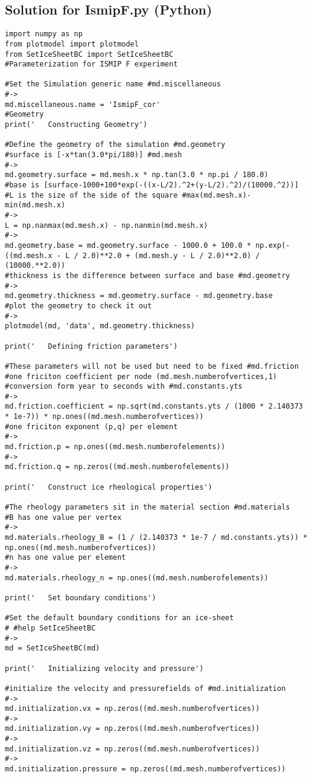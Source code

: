 \subsection{Solution for IsmipF.py (Python)}%
\begin{verbatim}import numpy as np
from plotmodel import plotmodel
from SetIceSheetBC import SetIceSheetBC
#Parameterization for ISMIP F experiment

#Set the Simulation generic name #md.miscellaneous
#->
md.miscellaneous.name = 'IsmipF_cor'
#Geometry
print('   Constructing Geometry')

#Define the geometry of the simulation #md.geometry
#surface is [-x*tan(3.0*pi/180)] #md.mesh
#->
md.geometry.surface = md.mesh.x * np.tan(3.0 * np.pi / 180.0)
#base is [surface-1000+100*exp(-((x-L/2).^2+(y-L/2).^2)/(10000.^2))]
#L is the size of the side of the square #max(md.mesh.x)-min(md.mesh.x)
#->
L = np.nanmax(md.mesh.x) - np.nanmin(md.mesh.x)
#->
md.geometry.base = md.geometry.surface - 1000.0 + 100.0 * np.exp(-((md.mesh.x - L / 2.0)**2.0 + (md.mesh.y - L / 2.0)**2.0) / (10000.**2.0))
#thickness is the difference between surface and base #md.geometry
#->
md.geometry.thickness = md.geometry.surface - md.geometry.base
#plot the geometry to check it out
#->
plotmodel(md, 'data', md.geometry.thickness)

print('   Defining friction parameters')

#These parameters will not be used but need to be fixed #md.friction
#one friciton coefficient per node (md.mesh.numberofvertices,1)
#conversion form year to seconds with #md.constants.yts
#->
md.friction.coefficient = np.sqrt(md.constants.yts / (1000 * 2.140373 * 1e-7)) * np.ones((md.mesh.numberofvertices))
#one friciton exponent (p,q) per element
#->
md.friction.p = np.ones((md.mesh.numberofelements))
#->
md.friction.q = np.zeros((md.mesh.numberofelements))

print('   Construct ice rheological properties')

#The rheology parameters sit in the material section #md.materials
#B has one value per vertex
#->
md.materials.rheology_B = (1 / (2.140373 * 1e-7 / md.constants.yts)) * np.ones((md.mesh.numberofvertices))
#n has one value per element
#->
md.materials.rheology_n = np.ones((md.mesh.numberofelements))

print('   Set boundary conditions')

#Set the default boundary conditions for an ice-sheet
# #help SetIceSheetBC
#->
md = SetIceSheetBC(md)

print('   Initializing velocity and pressure')

#initialize the velocity and pressurefields of #md.initialization
#->
md.initialization.vx = np.zeros((md.mesh.numberofvertices))
#->
md.initialization.vy = np.zeros((md.mesh.numberofvertices))
#->
md.initialization.vz = np.zeros((md.mesh.numberofvertices))
#->
md.initialization.pressure = np.zeros((md.mesh.numberofvertices))\end{verbatim}
